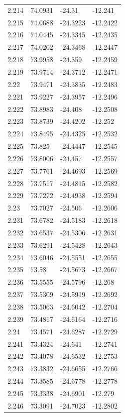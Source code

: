 \begin{tabular}{llll}
2.214 & 74.0931 & -24.31 & -12.241 \\
2.215 & 74.0688 & -24.3223 & -12.2422 \\
2.216 & 74.0445 & -24.3345 & -12.2435 \\
2.217 & 74.0202 & -24.3468 & -12.2447 \\
2.218 & 73.9958 & -24.359 & -12.2459 \\
2.219 & 73.9714 & -24.3712 & -12.2471 \\
2.22 & 73.9471 & -24.3835 & -12.2483 \\
2.221 & 73.9227 & -24.3957 & -12.2496 \\
2.222 & 73.8983 & -24.408 & -12.2508 \\
2.223 & 73.8739 & -24.4202 & -12.252 \\
2.224 & 73.8495 & -24.4325 & -12.2532 \\
2.225 & 73.825 & -24.4447 & -12.2545 \\
2.226 & 73.8006 & -24.457 & -12.2557 \\
2.227 & 73.7761 & -24.4693 & -12.2569 \\
2.228 & 73.7517 & -24.4815 & -12.2582 \\
2.229 & 73.7272 & -24.4938 & -12.2594 \\
2.23 & 73.7027 & -24.506 & -12.2606 \\
2.231 & 73.6782 & -24.5183 & -12.2618 \\
2.232 & 73.6537 & -24.5306 & -12.2631 \\
2.233 & 73.6291 & -24.5428 & -12.2643 \\
2.234 & 73.6046 & -24.5551 & -12.2655 \\
2.235 & 73.58 & -24.5673 & -12.2667 \\
2.236 & 73.5555 & -24.5796 & -12.268 \\
2.237 & 73.5309 & -24.5919 & -12.2692 \\
2.238 & 73.5063 & -24.6042 & -12.2704 \\
2.239 & 73.4817 & -24.6164 & -12.2716 \\
2.24 & 73.4571 & -24.6287 & -12.2729 \\
2.241 & 73.4324 & -24.641 & -12.2741 \\
2.242 & 73.4078 & -24.6532 & -12.2753 \\
2.243 & 73.3832 & -24.6655 & -12.2766 \\
2.244 & 73.3585 & -24.6778 & -12.2778 \\
2.245 & 73.3338 & -24.6901 & -12.279 \\
2.246 & 73.3091 & -24.7023 & -12.2802 \\

\end{tabular}
